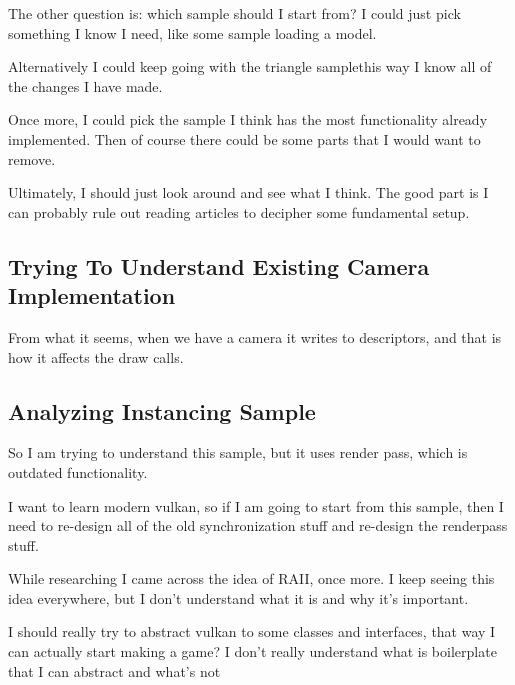 \documentclass{article}
\begin{document}
\par The other question is: which sample should I start from? I could
just pick something I know I need, like some sample loading a model.

\par Alternatively I could keep going with the triangle
sample\textemdash this way I know all of the changes I have made.

\par Once more, I could pick the sample I think has the most
functionality already implemented. Then of course there could be some
parts that I would want to remove.

\par Ultimately, I should just look around and see what I think. The
good part is I can probably rule out reading articles to decipher
some fundamental setup.

\subsection*{Trying To Understand Existing Camera
Implementation}
\par From what it seems, when we have a camera it writes to
descriptors, and that is how it affects the draw calls.

\subsection*{Analyzing Instancing
Sample}
\par So I am trying to understand this sample, but it uses render
pass, which is outdated functionality.

\par I want to learn modern vulkan, so if I am going to start from
this sample, then I need to re-design all of the old synchronization
stuff and re-design the renderpass stuff.

\par While researching I came across the idea of RAII, once more. I
keep seeing this idea everywhere, but I don't understand what it is
and why it's important.

\par I should really try to abstract vulkan to some classes and
interfaces, that way I can actually start making a game? I don't
really understand what is boilerplate that I can abstract and what's not
\end{document}
